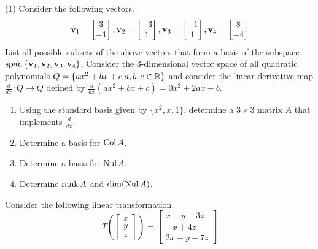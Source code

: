\begin{tasks}[resume, style=enumerate](1)
\task Consider the following vectors.
\begin{align*}
\mathbf v_1 = \begin{bmatrix}
      3   \\
      -1
\end{bmatrix},
\mathbf v_2 = \begin{bmatrix}
      -3  \\
      1
\end{bmatrix},
\mathbf v_3 = \begin{bmatrix}
      -1  \\
      1
\end{bmatrix},
\mathbf v_4 = \begin{bmatrix}
      8  \\
      -4
\end{bmatrix}
\end{align*}
List all possible subsets of the above vectors that form a basis of
the subspace $\operatorname{\mathrm{span}}\left\{\mathbf v_1,  \mathbf v_2,
\mathbf v_3,  \mathbf v_4 \right\}$.
\task Consider the 3-dimensional vector space of all quadratic
  polynomials $Q = \{a x^2 + b x + c  |  a,b,c \in \mathbb R\}$
  and consider the linear derivative map $\frac{d}{dx}: Q \to Q$
  defined by $\frac{d}{dx}(a x^2 + b x + c) = 0 x^2 + 2 a x + b$.
  \begin{enumerate}[label=(\alph*)]
  \item
    Using the standard basis given by $\{x^2, x, 1 \}$, determine a $3
    \times 3$ matrix $A$ that implements $\frac{d}{dx}$.
  \item
    Determine a basis for $\operatorname{\mathrm{Col}} A$.
  \item
    Determine a basis for $\operatorname{\mathrm{Nul}} A$.
  \item
    Determine $\operatorname{\mathrm{rank}} A$ and $\dim(\operatorname{\mathrm{Nul}} A)$.
  \end{enumerate}
\task
  Consider the following linear transformation.
  \begin{displaymath}
    T \left(\begin{bmatrix} x \\ y \\ z \end{bmatrix}\right)
    =
    \begin{bmatrix} x + y - 3z \\ -x + 4z \\ 2x + y - 7z \end{bmatrix}
  \end{displaymath}
  \begin{enumerate}[label=(\alph*)]

\end{enumerate}
\end{tasks}

